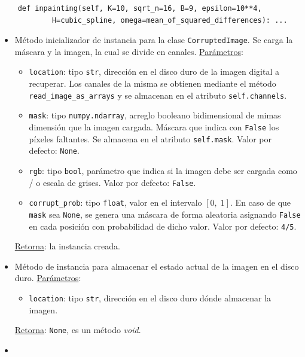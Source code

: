 \begin{enumerate}
\begin{lstlisting}
	def inpainting(self, K=10, sqrt_n=16, B=9, epsilon=10**4,
			H=cubic_spline, omega=mean_of_squared_differences): ...
	\end{lstlisting}
	\begin{itemize}
		\item {}
		
		M\'etodo inicializador de instancia para la clase \texttt{CorruptedImage}. Se carga la m\'ascara y la imagen, la cual se divide en canales. \underline{Par\'ametros}:
		\begin{itemize}
			\item \texttt{location}: tipo \texttt{str}, direcci\'on en el disco duro de la imagen digital a recuperar. Los canales de la misma se obtienen mediante el m\'etodo \texttt{read\_image\_as\_arrays} y se almacenan en el atributo \texttt{self.channels}.
			\item \texttt{mask}: tipo \texttt{numpy.ndarray}, arreglo booleano bidimensional de mimas dimensi\'on que la imagen cargada. M\'ascara que indica con \texttt{False} los p\'ixeles faltantes. Se almacena en el atributo \texttt{self.mask}. Valor por defecto: \texttt{None}.
			\item \texttt{rgb}: tipo \texttt{bool}, par\'ametro que indica si la imagen debe ser cargada como \RGB/ o escala de grises. Valor por defecto: \texttt{False}.
			\item \texttt{corrupt\_prob}: tipo \texttt{float}, valor en el intervalo $[0,\; 1]$. En caso de que \texttt{mask} sea \texttt{None}, se genera una m\'ascara de forma aleatoria asignando \texttt{False} en cada posici\'on con probabilidad de dicho valor. Valor por defecto: \texttt{4/5}. 
		\end{itemize}
		\underline{Retorna}: la instancia creada.
		
		\item {}
		
		M\'etodo de instancia para almacenar el estado actual de la imagen en el disco duro. \underline{Par\'ametros}:
		\begin{itemize}
			\item \texttt{location}: tipo \texttt{str}, direcci\'on en el disco duro d\'onde almacenar la imagen. 
		\end{itemize}
		\underline{Retorna}: \texttt{None}, es un m\'etodo \textit{void}.
		
		\item {}
		

\end{itemize}
\end{enumerate}
